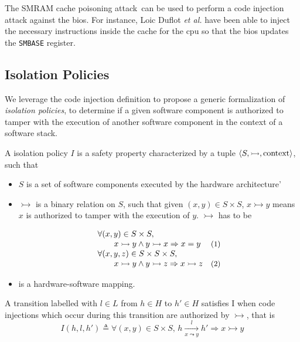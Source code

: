 \begin{example}
  The SMRAM cache poisoning attack\,\cite{duflot2009smram,wojtczuk2009smram} can
  be used to perform a code injection attack against the \ac{bios}. For
  instance, Loic Duflot \emph{et al.} have been able to inject the necessary
  instructions inside the cache for the \ac{cpu} so that the \ac{bios} updates
  the \texttt{SMBASE} register.
\end{example}

\subsection{Isolation Policies}
\label{subsec:speccert:globalsec}

We leverage the code injection definition to propose a generic formalization of
\emph{isolation policies}, to determine if a given software component is
authorized to tamper with the execution of another software component in the
context of a software stack.

\begin{definition}
  \label{def:speccert:global}
  A isolation policy $I$ is a safety property characterized by a tuple
  $\langle S, \rightarrowtail, \mathrm{context} \rangle$, such that
  \begin{itemize}
  \item $S$ is a set of software components executed by the hardware
    architecture'
  \item $\rightarrowtail$ is a binary relation on $S$, such that given
    $(x, y) \in S \times S$, $x \rightarrowtail y$ means $x$ is authorized to
    tamper with the execution of $y$. $\rightarrowtail$ has to be
    \[
      \begin{array}{lr}
        \forall (x, y) \in S \times S,
        & \\
        \qquad x \rightarrowtail y \wedge y
        \rightarrowtail x \Rightarrow x = y
        & \text{\small (1)} \\
        \forall (x, y, z) \in S \times S \times S,
        & \\
        \qquad x \rightarrowtail y \wedge y
        \rightarrowtail z \Rightarrow x \rightarrowtail z
        & \text{\small (2)}
      \end{array}
    \]
  \item {} is a hardware-software mapping.
  \end{itemize}

  A transition labelled with $l \in L$ from $h \in H$ to $h' \in H$ satisfies I
  when code injections which occur during this transition are authorized by
  $\rightarrowtail$, that is
  \[
    I(h, l, h') \triangleq \forall (x, y) \in S \times S \text{, } h
    \xrightarrow[x \leadsto y]{l} h' \Rightarrow x \rightarrowtail y
  \]
\end{definition}

